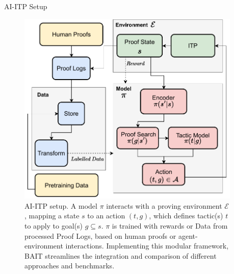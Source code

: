 \documentclass[final]{beamer}
\newlength{\onecolwid}
\newlength{\twocolwid}
\begin{document}
\begin{frame}[t]
\begin{columns}[t]
\begin{column}{\twocolwid}
\begin{columns}[t,totalwidth=\twocolwid]
\begin{column}{\onecolwid}
                        \begin{block}{AI-ITP Setup}
                            \begin{figure}
                                \includegraphics[width=\linewidth]{aitp}
                                \caption{ AI-ITP setup.
                                A model $\pi$ interacts with a proving environment $\mathcal{E}$,
                                    mapping a state $s$ to an action $(t,g)$, which defines tactic(s) $t$ to apply to goal(s) $g \subseteq s$.
                                    $\pi$ is trained with rewards or Data from processed Proof Logs, based on human proofs or agent-environment interactions.
                                    Implementing this modular framework, BAIT streamlines the integration and comparison of different approaches and benchmarks.}
                            \end{figure}
                            \label{aitp}
                        \end{block}



                    \end{column} %

                    \begin{column}{\onecolwid}
                        \vspace{-.6in} %


\end{column}
\end{columns}
\end{column}
\end{columns}
\end{frame}
\end{document}
